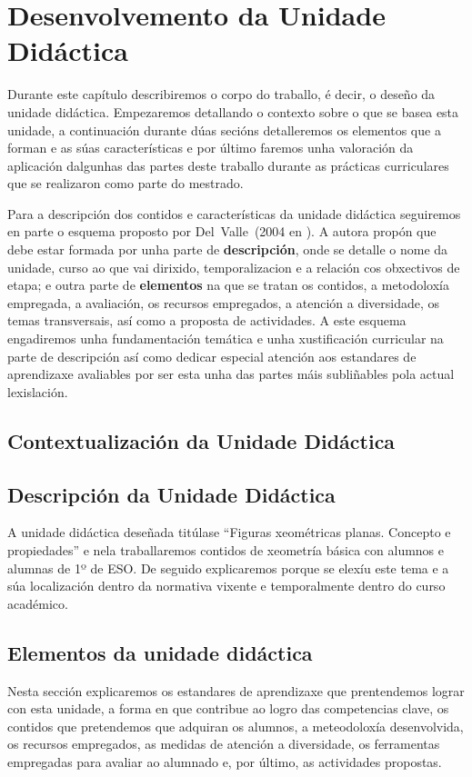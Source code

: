\chapter{Desenvolvemento da Unidade Didáctica}\label{chap:desenvolvemento}
Durante este capítulo describiremos o corpo do traballo, é decir, o deseño da unidade didáctica. Empezaremos detallando o contexto sobre o que se basea esta unidade, a continuación durante dúas secións detalleremos os elementos que a forman e as súas características e por último faremos unha valoración da aplicación dalgunhas das partes deste traballo durante as prácticas curriculares que se realizaron como parte do mestrado.

Para a descripción dos contidos e características da unidade didáctica seguiremos en parte o esquema proposto por Del~Valle~(2004 en ). A autora propón que debe estar formada por unha parte de \textbf{descripción}, onde se detalle o nome da unidade, curso ao que vai dirixido, temporalizacion e a relación cos obxectivos de etapa; e outra parte de \textbf{elementos} na que se tratan os contidos, a metodoloxía empregada, a avaliación, os recursos empregados, a atención a diversidade, os temas transversais, así como a proposta de actividades. A este esquema engadiremos unha fundamentación temática e unha xustificación curricular na parte de descripción así como dedicar especial atención aos estandares de aprendizaxe avaliables por ser esta unha das partes máis subliñables pola actual lexislación.

\section{Contextualización da Unidade Didáctica}


\section{Descripción da Unidade Didáctica}
A unidade didáctica deseñada titúlase ``Figuras xeométricas planas. Concepto e propiedades'' e nela traballaremos contidos de xeometría básica con alumnos e alumnas de 1º de ESO. De seguido explicaremos porque se elexíu este tema e a súa localización dentro da normativa vixente e temporalmente dentro do curso académico.





\section{Elementos da unidade didáctica}
Nesta sección explicaremos os estandares de aprendizaxe que prentendemos lograr con esta unidade, a forma en que contribue ao logro das competencias clave, os contidos que pretendemos que adquiran os alumnos, a meteodoloxía desenvolvida, os recursos empregados, as medidas de atención a diversidade, os ferramentas empregadas para avaliar ao alumnado e, por último, as actividades propostas.

